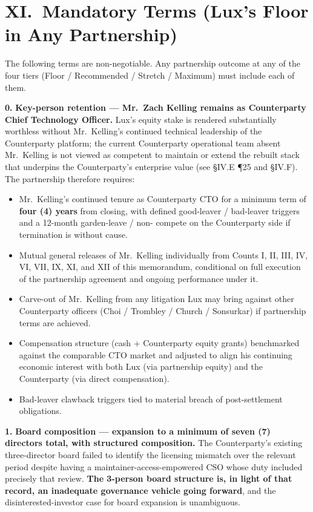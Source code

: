 \documentclass[11pt,letterpaper]{article}
\begin{document}
\section*{XI.\ Mandatory Terms (Lux's Floor in Any Partnership)}

The following terms are non-negotiable. Any partnership outcome at
any of the four tiers (Floor / Recommended / Stretch / Maximum) must
include each of them.

\textbf{0.} \textbf{Key-person retention --- Mr.\ Zach Kelling
remains as Counterparty Chief Technology Officer.} Lux's equity
stake is rendered substantially worthless without Mr.\ Kelling's
continued technical leadership of the Counterparty platform; the
current Counterparty operational team absent Mr.\ Kelling is not
viewed as competent to maintain or extend the rebuilt stack that
underpins the Counterparty's enterprise value (see \S IV.E ¶25 and
\S IV.F). The partnership therefore requires:
\begin{itemize}[leftmargin=2em,itemsep=0.1em]
\item Mr.\ Kelling's continued tenure as Counterparty CTO for a
minimum term of \textbf{four (4) years} from closing, with defined
good-leaver / bad-leaver triggers and a 12-month garden-leave / non-
compete on the Counterparty side if termination is without cause.
\item Mutual general releases of Mr.\ Kelling individually from
Counts I, II, III, IV, VI, VII, IX, XI, and XII of this memorandum,
conditional on full execution of the partnership agreement and
ongoing performance under it.
\item Carve-out of Mr.\ Kelling from any litigation Lux may bring
against other Counterparty officers (Choi / Trombley / Church /
Sonsurkar) if partnership terms are achieved.
\item Compensation structure (cash + Counterparty equity grants)
benchmarked against the comparable CTO market and adjusted to align
his continuing economic interest with both Lux (via partnership
equity) and the Counterparty (via direct compensation).
\item Bad-leaver clawback triggers tied to material breach of
post-settlement obligations.
\end{itemize}

\textbf{1.} \textbf{Board composition --- expansion to a minimum of
seven (7) directors total, with structured composition.} The
Counterparty's existing three-director board failed to identify the
licensing mismatch over the relevant period despite having a
maintainer-access-empowered CSO whose duty included precisely that
review. \textbf{The 3-person board structure is, in light of that
record, an inadequate governance vehicle going forward}, and the
disinterested-investor case for board expansion is unambiguous.
\end{document}
